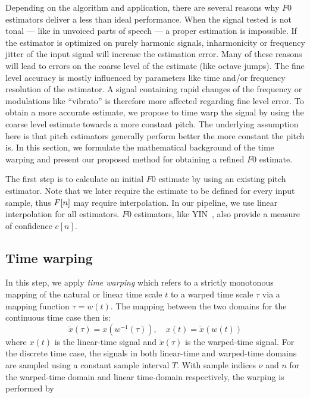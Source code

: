 Depending on the algorithm and application, there are several reasons why $F0$ estimators deliver a less than ideal performance. When the signal tested is not tonal --- like in unvoiced parts of speech --- a proper estimation is impossible. If the estimator is optimized on purely harmonic signals, inharmonicity or frequency jitter of the input signal will increase the estimation error. Many of these reasons will lead to errors on the coarse level of the estimate (like octave jumps). The fine level accuracy is mostly influenced by parameters like time and/or frequency resolution of the estimator. A signal containing rapid changes of the frequency or modulations like ``vibrato'' is therefore more affected regarding fine level error. To obtain a more accurate estimate, we propose to time warp the signal by using the coarse level estimate towards a more constant pitch. The underlying assumption here is that pitch estimators generally perform better the more constant the pitch is.
In this section, we formulate the mathematical background of the time warping and present our proposed method for obtaining a refined $F0$ estimate.

The first step is to calculate an initial $F0$ estimate by using an existing pitch estimator. Note that we later require the estimate to be defined for every input sample, thus ${F}[n]$ may require interpolation. In our pipeline, we use linear interpolation for all estimators. $F0$ estimators, like YIN~\cite{de2002yin}, also provide a measure of confidence $c[n]$.
\subsection{Time warping}
\label{sub:Refinement}

In this step, we apply \emph{time warping} which refers to a strictly monotonous mapping
of the natural or linear time scale $t$ to a warped time scale $\tau$ via a
mapping function $\tau=w(t)$.
The mapping between the two domains for the continuous time case then is:
\begin{equation}\label{eq:contWarpedTime}
\breve{x}(\tau)=x(w^{-1}(\tau)), \quad x(t)=\breve{x}(w(t))
\end{equation}
where $x(t)$ is the linear-time signal and $\breve{x}(\tau)$ is the warped-time signal.
For the discrete time case, the signals in both linear-time and warped-time domains are sampled
using a constant sample interval $T$. With sample indices $\nu$ and $n$ for the warped-time domain and linear time-domain respectively, the warping is performed by

